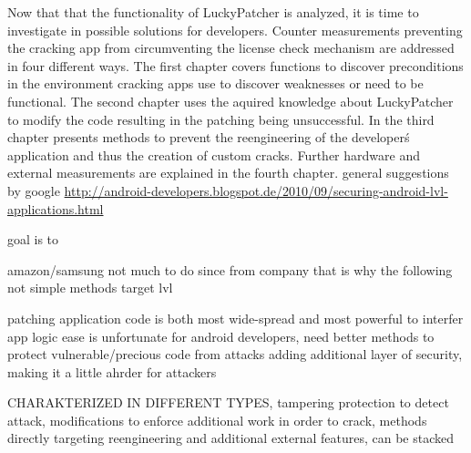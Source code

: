 Now that that the functionality of LuckyPatcher is analyzed, it is time to investigate in possible solutions for developers. Counter measurements preventing the cracking app from circumventing the license check mechanism are addressed in four different ways.\newline
The first chapter covers functions to discover preconditions in the environment cracking apps use to discover weaknesses or need to be functional. The second chapter uses the aquired knowledge about LuckyPatcher to modify the code resulting in the patching being unsuccessful. In the third chapter presents methods to prevent the reengineering of the developer\'s application and thus the creation of custom cracks. Further hardware and external measurements are explained in the fourth chapter.\newline
general suggestions by google  \url{http://android-developers.blogspot.de/2010/09/securing-android-lvl-applications.html}

%
goal is to

amazon/samsung not much to do since from company that is why the following not simple methods target lvl

patching application code is both most wide-spread and most powerful to interfer app logic
ease is unfortunate for android developers, need better methods to protect vulnerable/precious code from attacks
adding additional layer of security, making it a little ahrder for attackers

CHARAKTERIZED IN DIFFERENT TYPES, tampering protection to detect attack, modifications to enforce additional work in order to crack, methods directly targeting reengineering and additional external features, can be stacked
\cite{munteanLicense}
%
